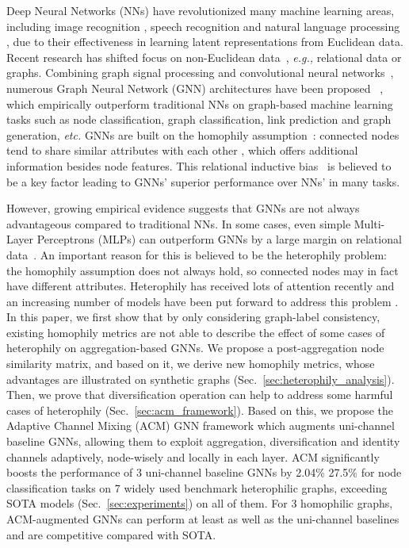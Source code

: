 \documentclass{article}
\newcommand\eg{\textit{e.g.,}}
\newcommand\etc{\textit{etc.}}
\newcommand{\0}{{\boldsymbol{0}}}
\newcommand{\6}{{\partial}}
\newcommand{\8}{{\infty}}
\newcommand{\4}{{\nabla}}
\begin{document}
Deep Neural Networks (NNs) \cite{lecun2015deep} have revolutionized many machine learning areas, including image recognition \cite{krizhevsky2012imagenet}, speech recognition \cite{graves2013speech} and natural language processing \cite{bahdanau2014neural}, due to their effectiveness in learning latent representations from Euclidean data. Recent research has shifted focus on non-Euclidean data~\cite{bronstein2016geometric}, \eg{} relational data or graphs. Combining graph signal processing and convolutional neural networks~\cite{lecun1998gradient}, numerous Graph Neural Network (GNN) architectures have been proposed ~\cite{scarselli2008graph,defferrard2016fast,hamilton2017inductive,velivckovic2017attention,kipf2016classification,luan2019break}, which empirically outperform traditional NNs on graph-based machine learning tasks such as node classification, graph classification, link prediction and graph generation, \etc 
GNNs are built on the homophily assumption~\cite{mcpherson2001birds}: connected nodes tend to share similar attributes with each other \cite{hamilton2020graph}, which offers additional information besides node features. This relational inductive bias~\cite{battaglia2018relational} is believed to be a key factor leading to GNNs' superior performance over NNs' in many tasks. 

However, growing empirical evidence suggests that GNNs are not always advantageous compared to traditional NNs. In some cases, even simple Multi-Layer Perceptrons (MLPs) can outperform GNNs by a large margin  on relational data~\cite{zhu2020beyond,liu2021non, luan2020complete,chien2021adaptive}. An important reason for this is believed to be the heterophily problem: the homophily assumption does not always hold, so connected nodes may in fact have different attributes. Heterophily has received lots of attention recently and an increasing number of models have been put forward to address this problem  \cite{zhu2020beyond,liu2021non,luan2020complete,chien2021adaptive,zhu2020graph,yan2021two,ma2021homophily, he2021bernnet,li2022finding}.  In this paper, we first show that by only considering graph-label consistency, existing homophily metrics are not able to describe the effect of some cases of heterophily on aggregation-based GNNs. 
We propose a post-aggregation node similarity matrix,
and based on it, we derive new homophily metrics, whose advantages are illustrated on synthetic graphs (Sec.~\ref{sec:heterophily_analysis}). Then, we prove that diversification operation can help to address some harmful cases of heterophily (Sec.~\ref{sec:acm_framework}). Based on this, we 
propose the Adaptive Channel Mixing (ACM) GNN framework which augments uni-channel baseline GNNs, allowing them to exploit aggregation, diversification and identity channels adaptively, node-wisely and locally in each layer. ACM significantly boosts the performance of 3 uni-channel baseline GNNs by 2.04\%  27.5\% for node classification tasks on 7 widely used benchmark heterophilic graphs, exceeding SOTA models (Sec.~\ref{sec:experiments}) on all of them. For 3 homophilic graphs, ACM-augmented GNNs can perform at least as well as the uni-channel baselines and are competitive compared with SOTA.
\vspace{-0.3cm}
\end{document}
